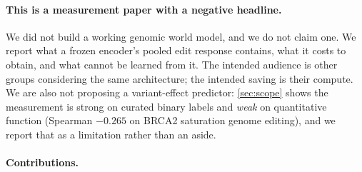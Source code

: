 \documentclass{article}
\begin{document}
\paragraph{This is a measurement paper with a negative headline.} We did not build a working
genomic world model, and we do not claim one. We report what a frozen encoder's pooled edit
response contains, what it costs to obtain, and what cannot be learned from it. The intended
audience is other groups considering the same architecture; the intended saving is their compute.
We are also not proposing a variant-effect predictor: \cref{sec:scope} shows the measurement is
strong on curated binary labels and \emph{weak} on quantitative function (Spearman $-0.265$ on
BRCA2 saturation genome editing), and we report that as a limitation rather than an aside.

\paragraph{Contributions.}
\end{document}
